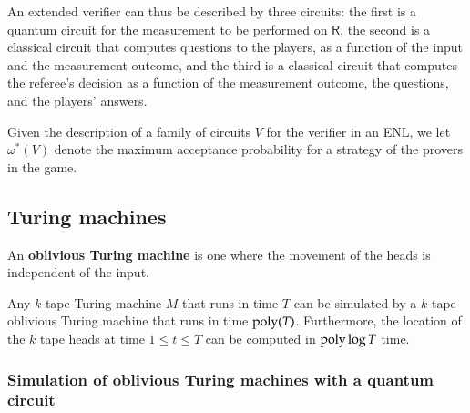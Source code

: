 \documentclass[11pt,letterpaper]{article}
\newcommand{\sR}{{\mathsf{R}}}
\begin{document}
An extended verifier can thus be described by three circuits: the first is a quantum circuit for the measurement to be performed on $\sR$, the second is a classical circuit that computes questions to the players, as a function of the input and the measurement outcome, and the third is a classical circuit that computes the referee's decision as a function of the measurement outcome, the questions, and the players' answers. 

\begin{definition}
Given the description of a family of circuits $V$ for the verifier in an ENL, we let $\omega^*(V)$ denote the maximum acceptance probability for a strategy of the provers in the game. 
\end{definition}


\subsection{Turing machines}
\label{sec:turing_machines}

An \textbf{oblivious Turing machine} is one where the movement of the heads is independent of the input.

\begin{theorem}\label{thm:pippenger}
Any $k$-tape Turing machine $M$ that runs in time $T$ can be simulated by a $k$-tape oblivious Turing machine that runs in time $\operatorname{poly}(T)$. Furthermore, the location of the $k$ tape heads at time $1 \leq t \leq T$ can be computed in $\operatorname{poly} \log T$ time.
\end{theorem}


\subsubsection{Simulation of oblivious Turing machines with a quantum circuit}
\end{document}
